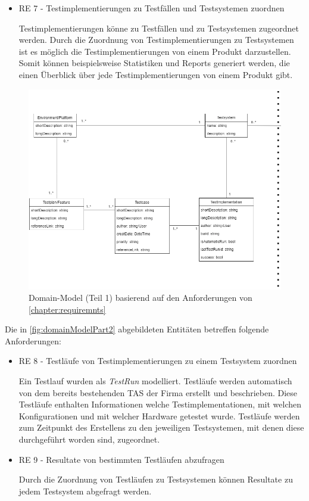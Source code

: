 \documentclass[a4paper, fontsize=11pt, parskip=half, twoside]{scrreprt}
\begin{document}
\begin{itemize}
		\item RE 7 - Testimplementierungen zu Testfällen und Testsystemen zuordnen
		
		Testimplementierungen könne zu Testfällen und zu Testsystemen zugeordnet werden.
		Durch die Zuordnung von Testimplementierungen zu Testsystemen ist es möglich die Testimplementierungen von einem Produkt darzustellen.
		Somit können beispielsweise Statistiken und Reports generiert werden, die einen Überblick über jede Testimplementierungen von einem Produkt gibt.
	\end{itemize}

	\begin{figure}[ht]
		\centering
		\includegraphics[scale=0.6]{assets/TCMS_DomainModel_part1.png}
		\caption{Domain-Model (Teil 1) basierend auf den Anforderungen von \autoref{chapter:requiremnts}}
		\label{fig:domainModelPart1}
	\end{figure}

	Die in \autoref{fig:domainModelPart2} abgebildeten Entitäten betreffen folgende Anforderungen:
	
	\begin{itemize}
		\item RE 8 - Testläufe von Testimplementierungen zu einem Testsystem zuordnen
		
		Ein Testlauf wurden als \emph{TestRun} modelliert.
		Testläufe werden automatisch von dem bereits bestehenden \ac{TAS} der Firma erstellt und beschrieben.
		Diese Testläufe enthalten Informationen welche Testimplementationen, mit welchen Konfigurationen und mit welcher Hardware getestet wurde.
		Testläufe werden zum Zeitpunkt des Erstellens zu den jeweiligen Testsystemen, mit denen diese durchgeführt worden sind, zugeordnet.
		
		\item RE 9 - Resultate von bestimmten Testläufen abzufragen
		
		Durch die Zuordnung von Testläufen zu Testsystemen können Resultate zu jedem Testsystem abgefragt werden.
	\end{itemize}
\end{document}
